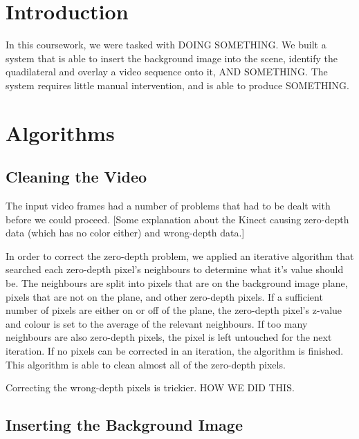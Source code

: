 \documentclass[11pt]{article}
\title{\thetitle}
\author{\theauthor}
\date{}
\begin{document}
\maketitle
\thispagestyle{empty}

\section{Introduction}

In this coursework, we were tasked with DOING SOMETHING. We built a system that
is able to insert the background image into the scene, identify the quadilateral
and overlay a video sequence onto it, AND SOMETHING. The system requires little
manual intervention, and is able to produce SOMETHING.

\section{Algorithms}

\subsection{Cleaning the Video}

The input video frames had a number of problems that had to be dealt with
before we could proceed. [Some explanation about the Kinect causing zero-depth
data (which has no color either) and wrong-depth data.]

In order to correct the zero-depth problem, we applied an iterative algorithm
that searched each zero-depth pixel's neighbours to determine what it's value
should be. The neighbours are split into pixels that are on the background
image plane, pixels that are not on the plane, and other zero-depth pixels.  If
a sufficient number of pixels are either on or off of the plane, the zero-depth
pixel's z-value and colour is set to the average of the relevant neighbours. If
too many neighbours are also zero-depth pixels, the pixel is left untouched for
the next iteration. If no pixels can be corrected in an iteration, the algorithm
is finished. This algorithm is able to clean almost all of the zero-depth pixels.

Correcting the wrong-depth pixels is trickier. HOW WE DID THIS.

\subsection{Inserting the Background Image}
\end{document}
